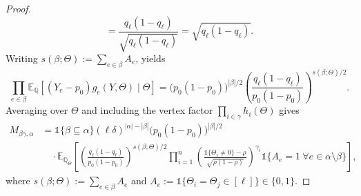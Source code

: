 \documentclass[10pt,a4paper]{amsart}
\newcommand{\E}{\mathbb{E}}
\newcommand{\QQ}{\mathbb{Q}}
\begin{document}
\begin{proof}
\[= \frac{q_\ell(1-q_\ell)}{\sqrt{q_\ell(1-q_\ell)}}
= \sqrt{q_\ell(1-q_\ell)}.
\]
Writing $s(\beta;\Theta):=\sum_{e\in\beta}A_e$, yields
\[
\prod_{e\in\beta}\E_{\QQ}[(Y_e-p_0)g_e(Y,\Theta)\mid\Theta]
=
\big(p_0(1-p_0)\big)^{|\beta|/2}
\left(\frac{q_\ell(1-q_\ell)}{p_0(1-p_0)}\right)^{s(\beta;\Theta)/2}.
\]
Averaging over $\Theta$ and including the vertex factor $\prod_{i\in\gamma}h_i(\Theta)$ gives
\begin{align*}
M_{\beta\gamma,\alpha}
&=
\mathds 1\{\beta\subseteq\alpha\} 
(\ell\delta)^{|\alpha|-|\beta|} 
\big(p_0(1-p_0)\big)^{|\beta|/2} \\
&\quad\cdot
\E_{\QQ_\Theta} \left[
\left(\frac{q_\ell(1-q_\ell)}{p_0(1-p_0)}\right)^{s(\beta;\Theta)/2}
\prod_{i=1}^n
\left(\frac{\mathds 1\{\Theta_i\neq 0\}-\rho}{\sqrt{\rho(1-\rho)}}\right)^{\gamma_i}
\mathds 1\{A_e=1\ \forall e\in\alpha\setminus\beta\}\right],
\end{align*}
%
where $s(\beta;\Theta):=\sum_{e\in\beta} A_e$ and $A_e:=\mathds 1\{\Theta_i=\Theta_j\in[\ell]\}\in\{0,1\}$.
\end{proof}
\end{document}
